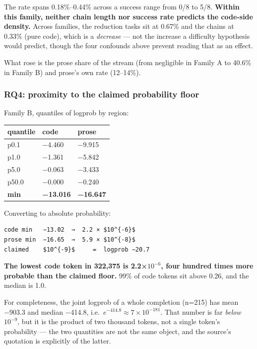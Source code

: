 \documentclass[
  11pt,
]{article}
\begin{document}
The rate spans 0.18\%--0.44\% across a success range from 0/8 to 5/8.
\textbf{Within this family, neither chain length nor success rate
predicts the code-side density.} Across families, the reduction tasks
sit at 0.67\% and the chains at 0.33\% (pure code), which is a
\emph{decrease} --- not the increase a difficulty hypothesis would
predict, though the four confounds above prevent reading that as an
effect.

What rose is the prose share of the stream (from negligible in Family A
to 40.6\% in Family B) and prose's own rate (12--14\%).

\hypertarget{rq4-proximity-to-the-claimed-probability-floor}{%
\subsubsection{RQ4: proximity to the claimed probability
floor}\label{rq4-proximity-to-the-claimed-probability-floor}}

Family B, quantiles of logprob by region:

\begin{longtable}[]{@{}lll@{}}
\toprule
quantile & code & prose \\
\midrule
\endhead
p0.1 & −4.460 & −9.915 \\
p1.0 & −1.361 & −5.842 \\
p5.0 & −0.063 & −3.433 \\
p50.0 & −0.000 & −0.240 \\
\textbf{min} & \textbf{−13.016} & \textbf{−16.647} \\
\bottomrule
\end{longtable}

Converting to absolute probability:

\begin{verbatim}
code min   −13.02  →  2.2 × $10^{-6}$
prose min  −16.65  →  5.9 × $10^{-8}$
claimed    $10^{-9}$     =  logprob −20.7
\end{verbatim}

\textbf{The lowest code token in 322,375 is 2.2×\(10^{-6}\), four
hundred times more probable than the claimed floor.} 99\% of code tokens
sit above 0.26, and the median is 1.0.

For completeness, the joint logprob of a whole completion (n=215) has
mean −903.3 and median −414.8,
i.e.~\(e^{-414.8} \approx 7\times10^{-181}\). That number is far
\emph{below} \(10^{-9}\), but it is the product of two thousand tokens,
not a single token's probability --- the two quantities are not the same
object, and the source's quotation is explicitly of the latter.
\end{document}
